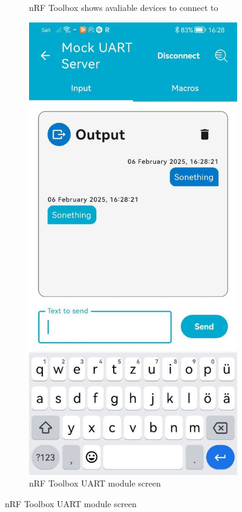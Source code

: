 \begin{figure}[ht!]
\begin{subfigure}{.4\linewidth}
	\caption{nRF Toolbox shows avaliable devices to connect to}
	\label{f:Toolbox_connect}
\end{subfigure}
\hspace*{.1\linewidth}
\begin{subfigure}{.4\linewidth}
	\includegraphics[trim={0 0 0 1.5cm},clip, width=\linewidth]{graphics/nRF_toolbox_messanger.jpg}
	\caption{nRF Toolbox UART module screen}
	\label{f:Toolbox_output}
\end{subfigure}
\end{figure}

